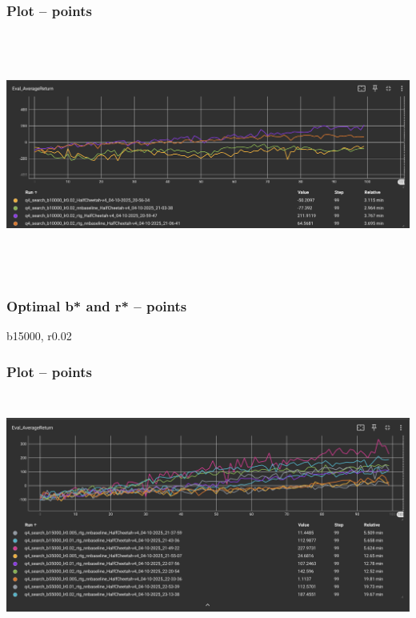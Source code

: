 \documentclass{article}
\begin{document}
\subsubsection{Plot --  points\rbrack}
\begin{answer}[title=Q7.2.2,height=10cm,width=\linewidth]
\centering
\includegraphics[height=8cm,width=\linewidth]{plots_submission/7_2_2_plot.png}
\end{answer}

\subsubsection{ Optimal b* and r* --  points\rbrack}
\begin{answer}[title=Q7.2.3,height=4cm,width=\linewidth]
b15000, r0.02
\end{answer}

\subsubsection{ Plot --  points\rbrack}
\begin{answer}[title=Q7.2.4,height=10cm,width=\linewidth]
\centering
\includegraphics[height=8cm,width=\linewidth]{plots_submission/7_2_4_plot.png}
\end{answer}
\end{document}
